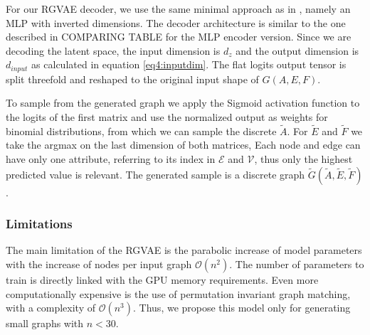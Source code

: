 For our RGVAE decoder, we use the same minimal approach as in \cite{simonovsky_graphvae_2018}, namely an MLP with inverted dimensions. The decoder architecture is similar to the one described in  COMPARING TABLE for the MLP encoder version. Since we are decoding the latent space, the input dimension is $d_z$ and the output dimension is $d_{input}$ as calculated in equation \ref{eq4:inputdim}. The flat logits output tensor is split threefold and reshaped to the original input shape of $G(A,E,F)$.   



To sample from the generated graph we apply the Sigmoid activation function to the logits of the first matrix and use the normalized output as weights for binomial distributions, from which we can sample the discrete $\tilde{A}$. For $\tilde{E}$ and $\tilde{F}$ we take the argmax on the last dimension of both matrices, Each node and edge can have only one attribute, referring to its index in $\mathcal{E}$ and $\mathcal{V}$, thus only the highest predicted value is relevant. The generated sample is a discrete graph $\tilde{G}(\tilde{A},\tilde{E},\tilde{F})$.


\subsubsection{Limitations}

The main limitation of the RGVAE is the parabolic increase of model parameters with the increase of nodes per input graph $\mathcal{O}(n^2)$. The number of parameters to train is directly linked with the GPU memory requirements. Even more computationally expensive is the use of permutation invariant graph matching, with a complexity of $\mathcal{O}(n^3)$. Thus, we propose this model only for generating small graphs with $n<30$.






